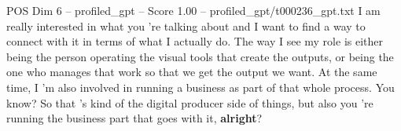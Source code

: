 \begin{textsample}{POS Dim 6 – profiled\_gpt – Score 1.00 – profiled\_gpt/t000236\_gpt.txt}  \label{ex:f6_pos_031}
I am really interested in what you ’re talking about and I want to find a way to connect with it in terms of what I actually do.
The way I see my role is either being the person operating the visual tools that create the outputs, or being the one who manages that work so that we get the output we want.
At the same time, I ’m also involved in running a business as part of that whole process.
You know?
So that ’s kind of the digital producer side of things, but also you ’re running the business part that goes with it, \textbf{alright}?

\end{textsample}
